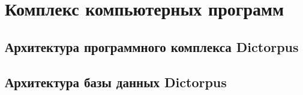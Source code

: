 \chapter{Комплекс компьютерных программ} \label{chapt_comp}

\section{Архитектура программного комплекса Dictorpus} \label{sect_arch_soft}

\section{Архитектура базы данных Dictorpus} \label{sect_arch_db}

